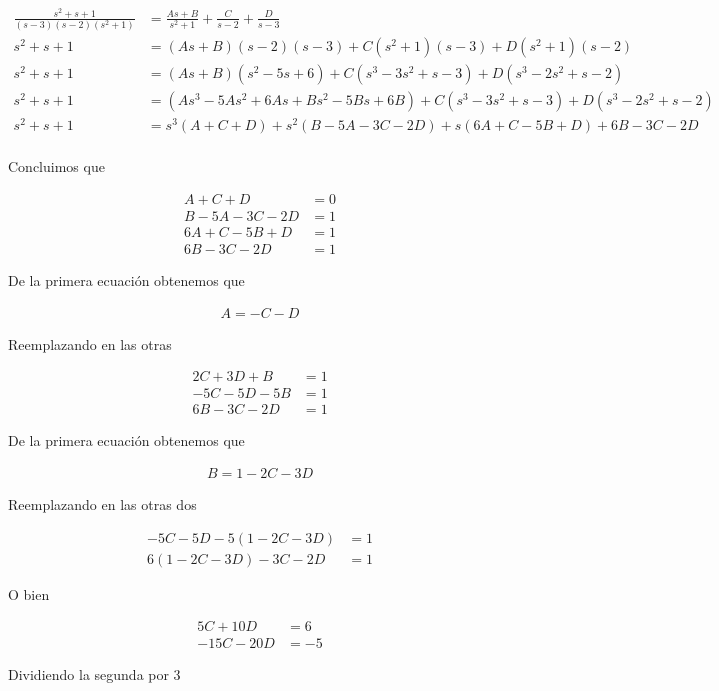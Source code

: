 \documentclass{article}
\theoremstyle{plain}
\theoremstyle{definition}
\begin{document}
\begin{align*}
    \frac{s^2+s+1}{(s-3)(s-2)(s^2+1)} &= \frac{As+B}{s^2+1}+\frac{C}{s-2}+\frac{D}{s-3} \\
    s^2+s+1 &= (As+B)(s-2)(s-3)+C(s^2+1)(s-3)+D(s^2+1)(s-2)\\
    s^2+s+1 &= (As+B)(s^2-5s+6)+C(s^3-3s^2+s-3)+D(s^3-2s^2+s-2)\\
    s^2+s+1 &= (As^3-5As^2+6As+Bs^2-5Bs+6B)+C(s^3-3s^2+s-3)+D(s^3-2s^2+s-2)\\
    s^2+s+1 &= s^3(A+C+D)+s^2(B-5A-3C-2D)+s(6A+C-5B+D)+6B-3C-2D\\
\end{align*}

Concluimos que

\begin{align*}
    A+C+D &=0 \\
    B-5A-3C-2D &=1 \\
    6A+C-5B+D&= 1 \\
    6B-3C-2D &= 1
\end{align*}

De la primera ecuación obtenemos que

\begin{align*}
    A=-C-D
\end{align*}

Reemplazando en las otras

\begin{align*}
    2C+3D+B &= 1 \\
    -5C-5D-5B &= 1 \\
    6B-3C-2D &= 1
\end{align*}

De la primera ecuación obtenemos que

\begin{align*}
    B=1-2C-3D
\end{align*}

Reemplazando en las otras dos

\begin{align*}
    -5C-5D-5(1-2C-3D) &= 1 \\
    6(1-2C-3D)-3C-2D &= 1
\end{align*}

O bien

\begin{align*}
    5C+10D&= 6 \\
    -15C-20D&= -5
\end{align*}

Dividiendo la segunda por 3
\end{document}
